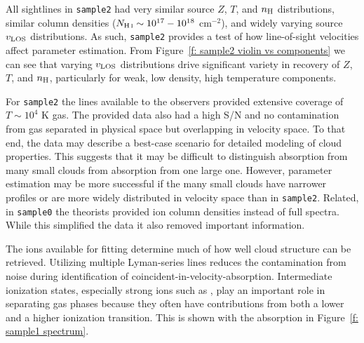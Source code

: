 \documentclass[fleqn,usenatbib]{mnras}
\begin{document}
All sightlines in \texttt{sample2} had very similar source $Z$, $T$, and $n_{\rm H}$ distributions,
similar column densities ($N_{\ion{H}{I}} \sim 10^{17}-10^{18}$ cm$^{-2}$),
and widely varying source $v_{\rm LOS}$ distributions. 
As such, \texttt{sample2} provides a test of how line-of-sight velocities affect parameter estimation.
From Figure~\ref{f: sample2 violin vs components} we can see that varying $v_{\rm LOS}$ distributions drive significant variety in recovery of $Z$, $T$, and $n_{\rm H}$, particularly for weak, low density, high temperature components.

For \texttt{sample2} the lines available to the observers provided extensive coverage of $T \sim 10^4$ K gas.
The provided data also had a high S/N and no contamination from gas separated in physical space but overlapping in velocity space.
To that end, the data may describe a best-case scenario for detailed modeling of cloud properties.
This suggests that it may be difficult to distinguish absorption from many small clouds from absorption from one large one.
However, parameter estimation may be more successful if the many small clouds have narrower profiles or are more widely distributed in velocity space than in \texttt{sample2}.
Related, in \texttt{sample0} the theorists provided ion column densities instead of full spectra.
While this simplified the data it also removed important information.


The ions available for fitting determine much of how well cloud structure can be retrieved.
Utilizing multiple Lyman-series lines reduces the contamination from noise during identification of coincident-in-velocity-absorption.
Intermediate ionization states, especially strong ions such as , play an important role in separating gas phases because they often have contributions from both a lower and a higher ionization transition.
This is shown with the  absorption in Figure~\ref{f: sample1 spectrum}.
\end{document}
